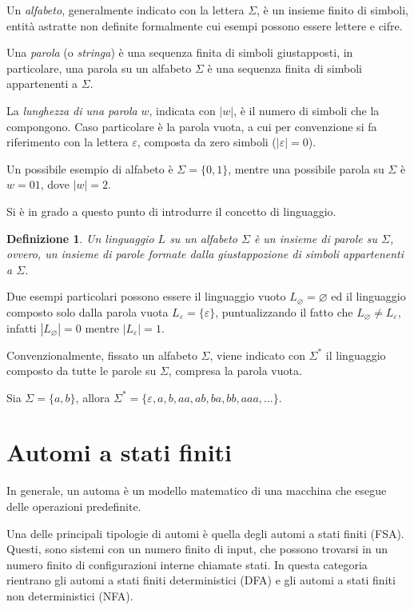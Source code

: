 \documentclass[a4paper,12pt,twoside,openright]{report}
\newtheorem{definition}{Definizione}[chapter] %
\begin{document}
Un \emph{alfabeto}, generalmente indicato con la lettera $\Sigma$, è un insieme finito di simboli,
entità astratte non definite formalmente cui esempi possono essere lettere e cifre.

Una \emph{parola} (o \emph{stringa}) è una sequenza finita di simboli giustapposti, in particolare, una parola su un alfabeto $\Sigma$
è una sequenza finita di simboli appartenenti a $\Sigma$.

La \emph{lunghezza di una parola} $w$, indicata con $|w|$, è il numero di simboli che la compongono.
Caso particolare è la parola vuota, a cui per convenzione si fa riferimento con la lettera $\varepsilon$,
composta da zero simboli ($|\varepsilon| = 0$).

Un possibile esempio di alfabeto è $\Sigma = \{0, 1\}$, mentre una possibile parola su $\Sigma$ è
$w = 01$, dove $|w| = 2$.

Si è in grado a questo punto di introdurre il concetto di linguaggio.

\begin{definition}\label{def:lang}
  Un \emph{linguaggio} $L$ su un alfabeto $\Sigma$ è un insieme di parole su $\Sigma$, ovvero, un insieme di
  parole formate dalla giustappozione di simboli appartenenti a $\Sigma$.
\end{definition}

Due esempi particolari possono essere il linguaggio vuoto $L_\varnothing = \varnothing$ ed il linguaggio composto
solo dalla parola vuota $L_\varepsilon = \{\varepsilon\}$, puntualizzando il fatto che $L_\varnothing \neq L_\varepsilon$,
infatti $|L_\varnothing| = 0$ mentre $|L_\varepsilon| = 1$.

Convenzionalmente, fissato un alfabeto $\Sigma$, viene indicato con $\Sigma^*$ il linguaggio composto da tutte
le parole su $\Sigma$, compresa la parola vuota.

Sia $\Sigma = \{a, b\}$, allora $\Sigma^* = \{\varepsilon, a, b, aa, ab, ba, bb, aaa, \dots\}$.

\section{Automi a stati finiti}

In generale, un automa è un modello matematico di una macchina che esegue delle operazioni predefinite.

Una delle principali tipologie di automi è quella degli automi a stati finiti (FSA). Questi, sono sistemi
con un numero finito di input, che possono trovarsi in un numero finito di configurazioni interne chiamate stati. 
In questa categoria rientrano gli automi a stati finiti deterministici (DFA) e gli automi a stati finiti 
non deterministici (NFA).
\end{document}
